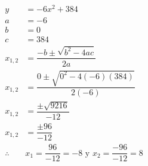 {\begin{solutionbox}{11cm}
\begin{multicols}{2}
\[\begin{array}{rl}
                    y          & =	      -6x^2 +384
                    \\
                    a          & =-6
                    \\
                    b          & =0
                    \\
                    c          & =384
                    \\
                    x_{1,2}    & = \dfrac{-b\pm\sqrt{b^2-4ac}}{2a}
                    \\[2em]
                    x_{1,2}    & = \dfrac{0\pm\sqrt{0^2-4(-6)(384)}}{2(-6)}
                    \\[2em]
                    x_{1,2}    & = \dfrac{\pm\sqrt{9216}}{-12}
                    \\[2em]
                    x_{1,2}    & = \dfrac{\pm96}{-12}
                    \\[2em]
                    \therefore & x_1 =\dfrac{96}{-12}=-8 \text{ y }  x_2
                    =\dfrac{-96}{-12}=8                                     \\[2em]
                \end{array}
            \]
        \end{multicols}
    \end{solutionbox}
}